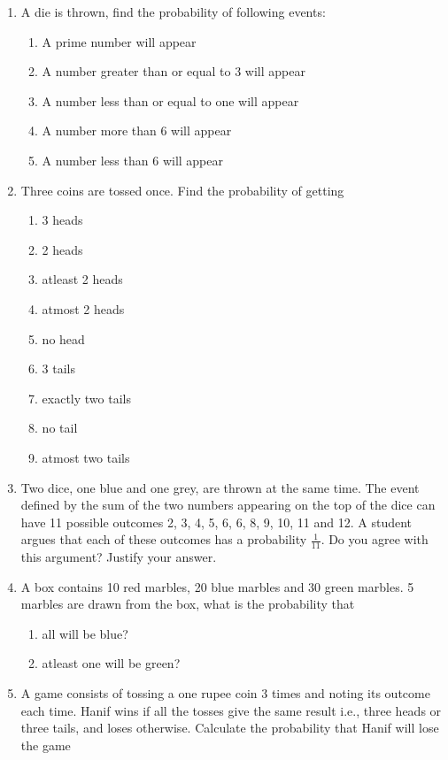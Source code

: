 \begin{enumerate}[label=\thechapter.\arabic*,ref=\thechapter.\theenumi]
\item A die is thrown, find the probability of following events:
\begin{enumerate}
\item A prime number will appear
\item A number greater than or equal to 3 will appear
\item A number less than or equal to one will appear
\item A number more than 6 will appear
\item A number less than 6 will appear
\end{enumerate}
\solution

  \item Three coins are tossed once. Find the probability of getting 
    \begin{enumerate}
        \item 3 heads
        \item 2 heads
        \item atleast 2 heads 
        \item atmost 2 heads
        \item no head
        \item 3 tails 
        \item exactly two tails
        \item no tail
        \item atmost two tails
    \end{enumerate}
\solution

	\item Two dice, one blue and one grey, are thrown at the same time.   The event defined by the sum of the two numbers appearing on the top of the dice can have 11 possible outcomes 2, 3, 4, 5, 6, 6, 8, 9, 10, 11 and 12.  A student argues that each of these outcomes has a probability $\frac{1}{11}$.  Do you agree with this argument?  Justify your answer.
\item A box contains 10 red marbles, 20 blue marbles and 30 green marbles. 5 marbles
are drawn from the box, what is the probability that
\begin{enumerate}
\item all will be blue?
\item atleast one will be green?
\end{enumerate}
\solution

	\item 
	A game consists of tossing a one rupee coin 3 times and noting its outcome each time. Hanif wins if all the tosses give the same result i.e., three heads or three tails, and loses otherwise. Calculate the probability that Hanif will lose the game

\end{enumerate}
